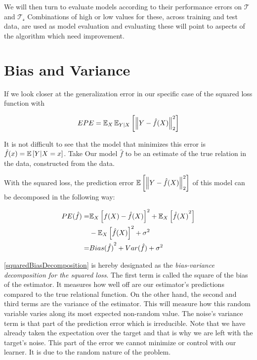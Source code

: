 
We will then turn to evaluate models according to their performance errors on $\mathcal{T}$ and $\mathcal{T_s}$ Combinations of high or low values for these, across training and test data, are used as model evaluation and evaluating these will point to aspects of the algorithm which need improvement.

\section{Bias and Variance}\label{section-biasVariance}

If we look closer at the generalization error in our specific case of the squared loss function with

\begin{equation}\label{squaredPE}
EPE = \operatorname{\mathbb{E}}_X \operatorname{\mathbb{E}}_{Y|X} \left[ \left\Vert Y - \hat{f}(X) \right\Vert_2^2 \right]
\end{equation}

It is not difficult to see that the model that minimizes this error is $\hat{f}(x) = \operatorname{\mathbb{E}} \left[ Y | X=x \right] $.
Take Our model $\hat{f}$ to be an estimate of the true relation in the data, constructed from the data.

With the squared loss, the prediction error $\operatorname{\mathbb{E}} \left[ \left\Vert Y - \hat{f}(X) \right\Vert_2^2 \right]$ of this model can be decomposed in the following way:

\begin{equation}\label{squaredBiasDecomposition}
\begin{split}
PE( \hat{f} ) = & {\operatorname{\mathbb{E}}_X \left[  f(X) - \hat{f}(X) \right]}^2 + \operatorname{\mathbb{E}}_X \left[ {\hat{f}(X)}^2 \right] \\
& - {\operatorname{\mathbb{E}}_X \left[ \hat{f}(X) \right] }^2 + \sigma^2 \\
= & {Bias(\hat{f})}^2 + Var(\hat{f}) + \sigma^2
\end{split}
\end{equation}


 \cref{squaredBiasDecomposition} is hereby designated as the \textit{bias-variance decomposition for the squared loss}.
The first term is called the square of the bias of the estimator.
It measures how well off are our estimator's predictions compared to the true relational function.
On the other hand, the second and third terms are the variance of the estimator.
This will measure how this random variable varies along its most expected non-random value.
The noise's variance term is that part of the prediction error which is irreducible.
Note that we have already taken the expectation over the target and that is why we are left with the target's noise.
This part of the error we cannot minimize or control with our learner.
It is due to the random nature of the problem.

